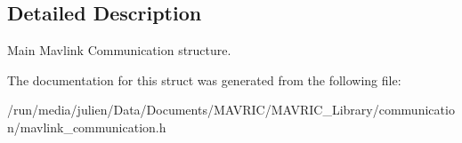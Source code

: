 \subsection{Detailed Description}
Main Mavlink Communication structure. 

The documentation for this struct was generated from the following file\+:\begin{DoxyCompactItemize}
\item 
/run/media/julien/\+Data/\+Documents/\+M\+A\+V\+R\+I\+C/\+M\+A\+V\+R\+I\+C\+\_\+\+Library/communication/mavlink\+\_\+communication.\+h\end{DoxyCompactItemize}
